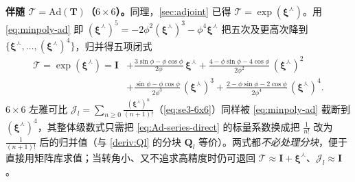 \begin{derivation}
\textbf{伴随 $\boldsymbol{\mathcal{T}}=\mathrm{Ad}(\mathbf{T})$（$6\times6$）。}同理，\cref{sec:adjoint} 已得 $\boldsymbol{\mathcal{T}}=\exp(\boldsymbol{\xi}^\curlywedge)$。用 \cref{eq:minpoly-ad} 即 $(\boldsymbol{\xi}^\curlywedge)^5=-2\phi^2(\boldsymbol{\xi}^\curlywedge)^3-\phi^4\boldsymbol{\xi}^\curlywedge$ 把五次及更高次降到 $\{\boldsymbol{\xi}^\curlywedge,\dots,(\boldsymbol{\xi}^\curlywedge)^4\}$，归并得五项闭式
\begin{equation}
  \begin{aligned}
  \boldsymbol{\mathcal{T}}=\exp(\boldsymbol{\xi}^\curlywedge)
  =\mathbf{I}
  &+\frac{3\sin\phi-\phi\cos\phi}{2\phi}\,\boldsymbol{\xi}^\curlywedge
   +\frac{4-\phi\sin\phi-4\cos\phi}{2\phi^2}\,(\boldsymbol{\xi}^\curlywedge)^2\\
  &+\frac{\sin\phi-\phi\cos\phi}{2\phi^3}\,(\boldsymbol{\xi}^\curlywedge)^3
   +\frac{2-\phi\sin\phi-2\cos\phi}{2\phi^4}\,(\boldsymbol{\xi}^\curlywedge)^4.
  \end{aligned}
  \label{eq:Ad-series-direct}
\end{equation}
$6\times6$ 左雅可比 $\boldsymbol{\mathcal{J}}_l=\sum_{n\ge0}\tfrac{(\boldsymbol{\xi}^\curlywedge)^n}{(n+1)!}$（\cref{eq:se3-6x6}）同样被 \cref{eq:minpoly-ad} 截断到 $(\boldsymbol{\xi}^\curlywedge)^4$，其整体级数式只需把 \cref{eq:Ad-series-direct} 的标量系数换成把 $\tfrac1{n!}$ 改为 $\tfrac1{(n+1)!}$ 后的归并值（与 \cref{deriv:Ql} 的分块 $\mathbf{Q}_l$ 等价）。两式都\emph{不必处理分块}，便于直接用矩阵库求值；当转角小、又不追求高精度时仍可退回 $\boldsymbol{\mathcal{T}}\approx\mathbf{I}+\boldsymbol{\xi}^\curlywedge$、$\boldsymbol{\mathcal{J}}_l\approx\mathbf{I}$。
\end{derivation}

